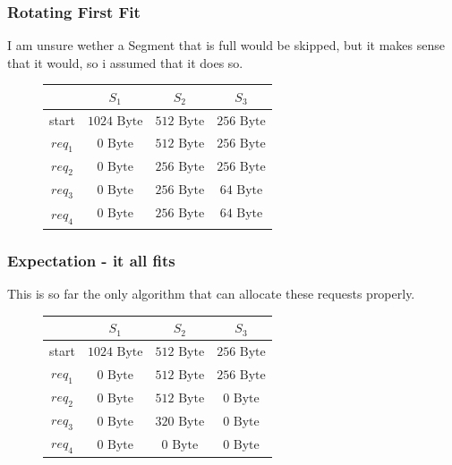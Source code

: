 \documentclass[a4paper, 11pt]{article}
\begin{document}
    \subsubsection{Rotating First Fit}
    I am unsure wether a Segment that is full would be skipped, but it makes sense that it would, so i assumed that it does so.
    \begin{figure}[h]
          \centering
          \begin{tabular}{|c|c|c|c|}
            \hline
            &$S_1$&$S_2$&$S_3$\\\hline
            start&$1024 \mbox{ Byte}$&$512 \mbox{ Byte}$&$256 \mbox{ Byte}$\\
            $req_1$&$0 \mbox{ Byte}$&$512 \mbox{ Byte}$&$256 \mbox{ Byte}$\\
            $req_2$&$0 \mbox{ Byte}$&$256 \mbox{ Byte}$&$256 \mbox{ Byte}$\\
            $req_3$&$0 \mbox{ Byte}$&$256 \mbox{ Byte}$&$64 \mbox{ Byte}$\\\hline\hline
            \multirow{2}{*}{$req_4$}&$0 \mbox{ Byte}$&$256 \mbox{ Byte}$&$64 \mbox{ Byte}$\\ \cline{2-4}&\multicolumn{3}{c|}{\color{red}{Cannot fit into $S_2$}}\\
            \hline
      
          \end{tabular}
    \end{figure}

    \subsubsection{Expectation - it all fits}
    This is so far the only algorithm that can allocate these requests properly.
    \begin{figure}[h]
      \centering
      \begin{tabular}{|c|c|c|c|}
        \hline
        &$S_1$&$S_2$&$S_3$\\\hline
        start&$1024 \mbox{ Byte}$&$512 \mbox{ Byte}$&$256 \mbox{ Byte}$\\
        $req_1$&$0 \mbox{ Byte}$&$512 \mbox{ Byte}$&$256 \mbox{ Byte}$\\
        $req_2$&$0 \mbox{ Byte}$&$512 \mbox{ Byte}$&$0 \mbox{ Byte}$\\
        $req_3$&$0 \mbox{ Byte}$&$320 \mbox{ Byte}$&$0 \mbox{ Byte}$\\
        $req_4$&$0 \mbox{ Byte}$&$0 \mbox{ Byte}$&$0 \mbox{ Byte}$\\\hline
  
      \end{tabular}
\end{figure} 
    \newpage
\end{document}
